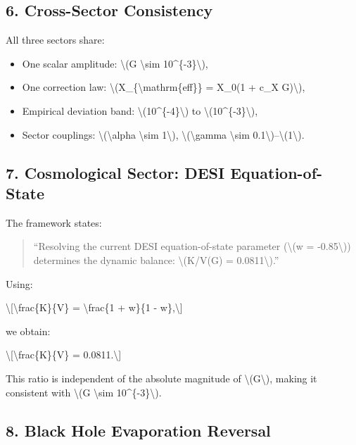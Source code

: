 \documentclass[
  10pt,
]{article}
\providecommand{\tightlist}{%
  \setlength{\itemsep}{0pt}\setlength{\parskip}{0pt}}
\begin{document}
\hypertarget{cross-sector-consistency}{%
\subsection{6. Cross-Sector
Consistency}\label{cross-sector-consistency}}

All three sectors share:

\begin{itemize}
\tightlist
\item
  One scalar amplitude: \textbackslash(G \textbackslash sim
  10\^{}\{-3\}\textbackslash),
\item
  One correction law: \textbackslash(X\_\{\textbackslash mathrm\{eff\}\}
  = X\_0(1 + c\_X G)\textbackslash),
\item
  Empirical deviation band: \textbackslash(10\^{}\{-4\}\textbackslash)
  to \textbackslash(10\^{}\{-3\}\textbackslash),
\item
  Sector couplings: \textbackslash(\textbackslash alpha
  \textbackslash sim 1\textbackslash),
  \textbackslash(\textbackslash gamma \textbackslash sim
  0.1\textbackslash)--\textbackslash(1\textbackslash).
\end{itemize}

\hypertarget{cosmological-sector-desi-equation-of-state}{%
\subsection{7. Cosmological Sector: DESI
Equation-of-State}\label{cosmological-sector-desi-equation-of-state}}

The framework states:

\begin{quote}
``Resolving the current DESI equation-of-state parameter
(\textbackslash(w = -0.85\textbackslash)) determines the dynamic
balance: \textbackslash(K/V(G) = 0.0811\textbackslash).''
\end{quote}

Using:

\textbackslash{[}\textbackslash frac\{K\}\{V\} = \textbackslash frac\{1
+ w\}\{1 - w\},\textbackslash{]}

we obtain:

\textbackslash{[}\textbackslash frac\{K\}\{V\} =
0.0811.\textbackslash{]}

This ratio is independent of the absolute magnitude of
\textbackslash(G\textbackslash), making it consistent with
\textbackslash(G \textbackslash sim 10\^{}\{-3\}\textbackslash).

\hypertarget{black-hole-evaporation-reversal}{%
\subsection{8. Black Hole Evaporation
Reversal}\label{black-hole-evaporation-reversal}}
\end{document}
